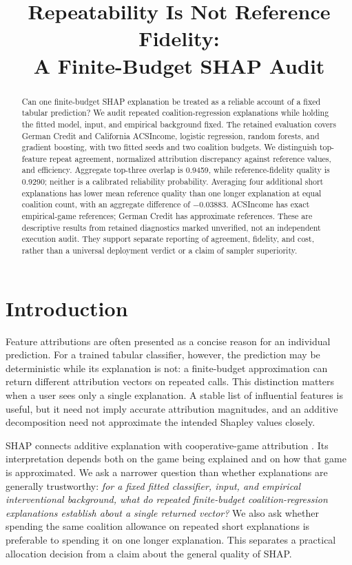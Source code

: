 \documentclass{article}
\title{Repeatability Is Not Reference Fidelity:\\A Finite-Budget SHAP Audit}
\author{}
\begin{document}
\maketitle

\begin{abstract}
Can one finite-budget SHAP explanation be treated as a reliable account of a fixed tabular prediction? We audit repeated coalition-regression explanations while holding the fitted model, input, and empirical background fixed. The retained evaluation covers German Credit and California ACSIncome, logistic regression, random forests, and gradient boosting, with two fitted seeds and two coalition budgets. We distinguish top-feature repeat agreement, normalized attribution discrepancy against reference values, and efficiency. Aggregate top-three overlap is 0.9459, while reference-fidelity quality is 0.9290; neither is a calibrated reliability probability. Averaging four additional short explanations has lower mean reference quality than one longer explanation at equal coalition count, with an aggregate difference of $-0.03883$. ACSIncome has exact empirical-game references; German Credit has approximate references. These are descriptive results from retained diagnostics marked unverified, not an independent execution audit. They support separate reporting of agreement, fidelity, and cost, rather than a universal deployment verdict or a claim of sampler superiority.
\end{abstract}

\section{Introduction}
Feature attributions are often presented as a concise reason for an individual prediction. For a trained tabular classifier, however, the prediction may be deterministic while its explanation is not: a finite-budget approximation can return different attribution vectors on repeated calls. This distinction matters when a user sees only a single explanation. A stable list of influential features is useful, but it need not imply accurate attribution magnitudes, and an additive decomposition need not approximate the intended Shapley values closely.

SHAP connects additive explanation with cooperative-game attribution \citep{Shapley1953,Lundberg2017}. Its interpretation depends both on the game being explained and on how that game is approximated. We ask a narrower question than whether explanations are generally trustworthy: \emph{for a fixed fitted classifier, input, and empirical interventional background, what do repeated finite-budget coalition-regression explanations establish about a single returned vector?} We also ask whether spending the same coalition allowance on repeated short explanations is preferable to spending it on one longer explanation. This separates a practical allocation decision from a claim about the general quality of SHAP.
\end{document}
